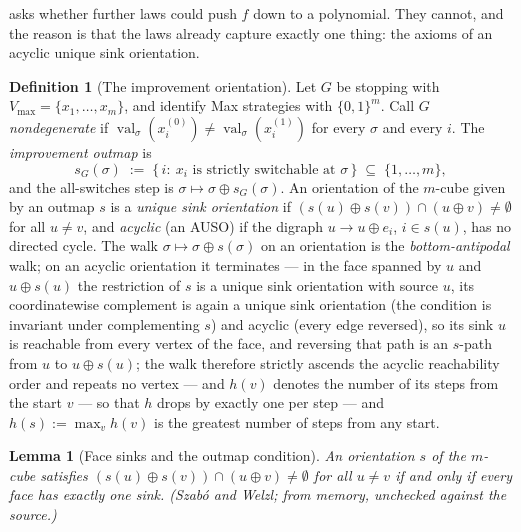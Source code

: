 \documentclass[11pt]{article}
\theoremstyle{plain}
\newtheorem{lemma}[theorem]{Lemma}
\theoremstyle{definition}
\newtheorem{definition}[theorem]{Definition}
\DeclareMathOperator{\val}{val}
\newcommand{\Vmax}{V_{\max}}
\begin{document}
 asks whether further laws could push $f$ down to a
polynomial. They cannot, and the reason is that the laws already capture
exactly one thing: the axioms of an acyclic unique sink orientation.

\begin{definition}[The improvement orientation]\label{def:improvement-uso}
Let $G$ be stopping with $\Vmax=\{x_1,\dots,x_m\}$, and identify Max strategies
with $\{0,1\}^{m}$. Call $G$ \emph{nondegenerate} if
$\val_\sigma(x_i^{(0)})\ne\val_\sigma(x_i^{(1)})$ for every $\sigma$ and every
$i$. The \emph{improvement outmap} is
\[
  s_G(\sigma)\;:=\;\{\,i:\ x_i\text{ is strictly switchable at }\sigma\,\}
  \;\subseteq\;\{1,\dots,m\},
\]
and the all-switches step is $\sigma\mapsto\sigma\oplus s_G(\sigma)$. An
orientation of the $m$-cube given by an outmap $s$ is a \emph{unique sink
orientation} if $(s(u)\oplus s(v))\cap(u\oplus v)\ne\emptyset$ for all $u\ne v$,
and \emph{acyclic} (an AUSO) if the digraph $u\to u\oplus e_i$, $i\in s(u)$, has
no directed cycle. The walk $\sigma\mapsto\sigma\oplus s(\sigma)$ on an
orientation is the \emph{bottom-antipodal} walk; on an acyclic orientation
it terminates --- in the face spanned by $u$ and $u\oplus s(u)$ the
restriction of $s$ is a unique sink orientation with source $u$, its
coordinatewise complement is again a unique sink orientation (the
condition is invariant under complementing $s$) and acyclic (every edge
reversed), so its sink $u$ is reachable from every vertex of the face,
and reversing that path is an $s$-path from $u$ to $u\oplus s(u)$; the
walk therefore strictly ascends the acyclic reachability order and
repeats no vertex --- and $h(v)$ denotes the number of its steps from the start $v$
--- so that $h$ drops by exactly one per step --- and
$h(s):=\max_vh(v)$ is the greatest number of steps from any start.
\end{definition}

\begin{lemma}[Face sinks and the outmap condition]\label{lem:sw}
An orientation $s$ of the $m$-cube satisfies
$(s(u)\oplus s(v))\cap(u\oplus v)\ne\emptyset$ for all $u\ne v$ if and only
if every face has exactly one sink. (Szab\'o and Welzl; from memory,
unchecked against the source.)
\end{lemma}
\end{document}
